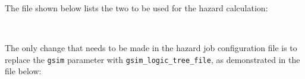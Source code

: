 The file shown below lists the two  to be used for the hazard
calculation:

\inputminted[firstline=1,firstnumber=1,fontsize=\footnotesize,frame=single,linenos,bgcolor=lightgray,label=gsim\_logic\_tree.xml]{xml}{oqum/risk/verbatim/input_scenario_gmlt.xml}\\

The only change that needs to be made in the hazard job configuration file is
to replace the \Verb+gsim+ parameter with \Verb+gsim_logic_tree_file+, as
demonstrated in the file below:

\inputminted[firstline=1,firstnumber=1,fontsize=\footnotesize,frame=single,linenos,bgcolor=lightgray,label=job\_hazard.ini]{ini}{oqum/risk/verbatim/config_scenario_hazard_gmlt.ini}\\

